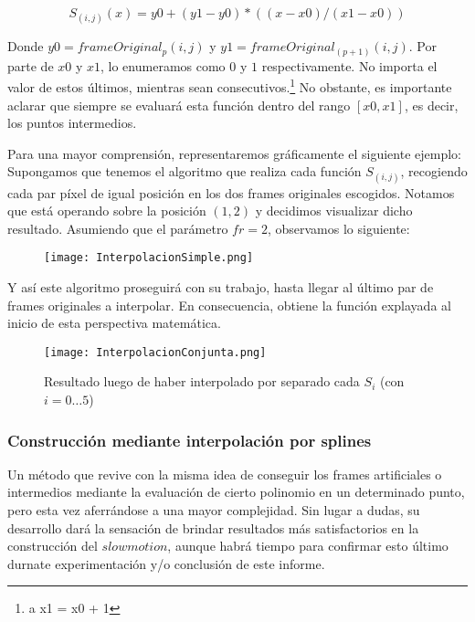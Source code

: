 \[
S_{(i,j)}(x) = y0 + (y1 - y0) * ( ( x - x0 ) / (x1 - x0) ) 
\]

Donde $y0 = frameOriginal_{p}(i,j)$ y $y1 = frameOriginal_{(p+1)}(i,j)$. Por parte de $x0$ y $x1$, lo enumeramos como $0$ y $1$ respectivamente. No importa el valor de estos \'ultimos, mientras sean consecutivos.\footnote{ a x1 = x0 + 1} No obstante, es importante aclarar que siempre se evaluar\'a esta funci\'on dentro del rango $[x0 ,x1]$, es decir, los puntos intermedios.

Para una mayor comprensi\'on, representaremos gr\'aficamente el siguiente ejemplo: Supongamos que tenemos el algoritmo que realiza cada funci\'on $S_{(i,j)}$, recogiendo cada par p\'ixel de igual posici\'on en los dos frames originales escogidos. Notamos que est\'a operando sobre la posici\'on $(1,2)$ y decidimos visualizar dicho resultado. Asumiendo que el par\'ametro $fr = 2$, observamos lo siguiente:

\begin{figure}[h!]
  \centering
    \texttt{[image: InterpolacionSimple.png]}
     \label{fig:intSimple}
\end{figure}
\noindent

Y as\'i este algoritmo proseguir\'a con su trabajo, hasta llegar al \'ultimo par de frames originales a interpolar. En consecuencia, obtiene la funci\'on explayada al inicio de esta perspectiva matem\'atica.


\begin{figure}[h!]
  \centering
    \texttt{[image: InterpolacionConjunta.png]}
     \caption{Resultado luego de haber interpolado por separado cada $S_{i}$ (con $i = 0 \ldots 5$)}\label{fig:intConjunta}
\end{figure}
\noindent

\subsubsection{Construcción mediante interpolación por splines}

Un m\'etodo que revive con la misma idea de conseguir los frames artificiales o intermedios mediante la evaluaci\'on de cierto polinomio en un determinado punto, pero esta vez aferr\'andose a una mayor complejidad. Sin lugar a dudas, su desarrollo dar\'a la sensaci\'on de brindar resultados m\'as satisfactorios en la construcci\'on del $slowmotion$, aunque habr\'a tiempo para confirmar esto \'ultimo durnate experimentaci\'on y/o conclusi\'on de este informe.